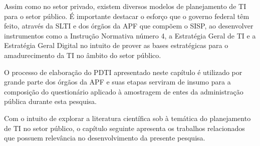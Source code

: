 Assim como no setor privado, existem diversos modelos de planejamento de TI para o setor público. É importante destacar o esforço que o governo federal têm feito, através da SLTI e dos órgãos da APF que compõem o SISP, ao desenvolver instrumentos como a Instrução Normativa número 4, a Estratégia Geral de TI e a Estratégia Geral Digital no intuito de prover as bases estratégicas para o amadurecimento da TI no âmbito do setor público.

O processo de elaboração do PDTI apresentado neste capítulo é utilizado por grande parte dos órgãos da APF e suas etapas serviram de insumo para a composição do questionário aplicado à amostragem de entes da administração pública durante esta pesquisa. 

Com o intuito de explorar a literatura científica sob à temática do planejamento de TI no setor público, o capítulo seguinte apresenta os trabalhos relacionados que possuem relevância no desenvolvimento da presente pesquisa.